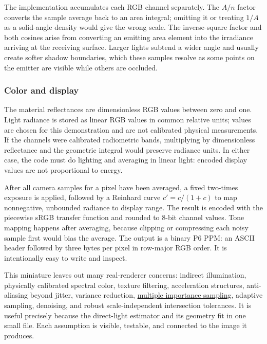 The implementation accumulates each RGB channel separately. The \(A/n\) factor converts the sample average back to an area integral; omitting it or treating \(1/A\) as a solid-angle density would give the wrong scale. The inverse-square factor and both cosines arise from converting an emitting area element into the irradiance arriving at the receiving surface. Larger lights subtend a wider angle and usually create softer shadow boundaries, which these samples resolve as some points on the emitter are visible while others are occluded.

\subsubsection{Color and display}\label{04-visual-computing-ii-ch035-color-and-display}

The material reflectances are dimensionless RGB values between zero and one. Light radiance is stored as linear RGB values in common relative units; values are chosen for this demonstration and are not calibrated physical measurements. If the channels were calibrated radiometric bands, multiplying by dimensionless reflectance and the geometric integral would preserve radiance units. In either case, the code must do lighting and averaging in linear light: encoded display values are not proportional to energy.

After all camera samples for a pixel have been averaged, a fixed two-times exposure is applied, followed by a Reinhard curve \(c'=c/(1+c)\) to map nonnegative, unbounded radiance to display range. The result is encoded with the piecewise sRGB transfer function and rounded to 8-bit channel values. Tone mapping happens after averaging, because clipping or compressing each noisy sample first would bias the average. The output is a binary P6 PPM: an ASCII header followed by three bytes per pixel in row-major RGB order. It is intentionally easy to write and inspect.

This miniature leaves out many real-renderer concerns: indirect illumination, physically calibrated spectral color, texture filtering, acceleration structures, anti-aliasing beyond jitter, variance reduction, \hyperref[appendix-031e02bf28af]{multiple importance sampling}, adaptive sampling, denoising, and robust scale-independent intersection tolerances. It is useful precisely because the direct-light estimator and its geometry fit in one small file. Each assumption is visible, testable, and connected to the image it produces.

